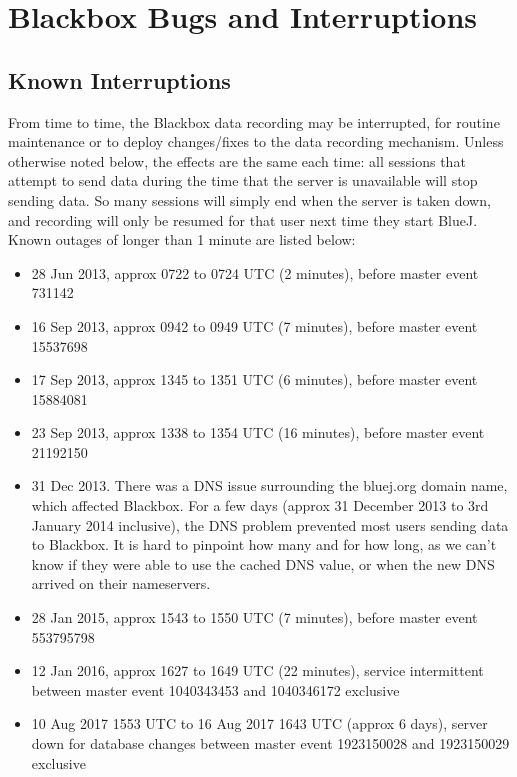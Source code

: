 \documentclass{report}
\begin{document}
\chapter{Blackbox Bugs and Interruptions}
\label{sec:interruptions}
\section{Known Interruptions}

From time to time, the Blackbox data recording may be interrupted, for routine maintenance or to deploy changes/fixes to the data recording mechanism.
Unless otherwise noted below, the effects are the same each time: all sessions that attempt to send data during the time that the server is unavailable will stop sending data.  So many sessions will simply end when the server is taken down, and recording will only be resumed for that user next time they start BlueJ.  Known outages of longer than 1 minute are listed below:

\begin{itemize}
\item 28 Jun 2013, approx 0722 to 0724 UTC (2 minutes), before master event 731142
\item 16 Sep 2013, approx 0942 to 0949 UTC (7 minutes), before master event 15537698
\item 17 Sep 2013, approx 1345 to 1351 UTC (6 minutes), before master event 15884081
\item 23 Sep 2013, approx 1338 to 1354 UTC (16 minutes), before master event 21192150
\item 31 Dec 2013.  There was a DNS issue surrounding the bluej.org domain name, which affected Blackbox.  For a few days (approx 31 December 2013 to 3rd January 2014 inclusive), the DNS problem prevented most users sending data to Blackbox.  It is hard to pinpoint how many and for how long, as we can't know if they were able to use the cached DNS value, or when the new DNS arrived on their nameservers.
\item 28 Jan 2015, approx 1543 to 1550 UTC (7 minutes), before master event 553795798
\item 12 Jan 2016, approx 1627 to 1649 UTC (22 minutes), service intermittent between master event 1040343453 and 1040346172 exclusive
\item 10 Aug 2017 1553 UTC to 16 Aug 2017 1643 UTC (approx 6 days), server down for
 database changes between master event 1923150028 and 1923150029 exclusive
\end{itemize}
\end{document}
